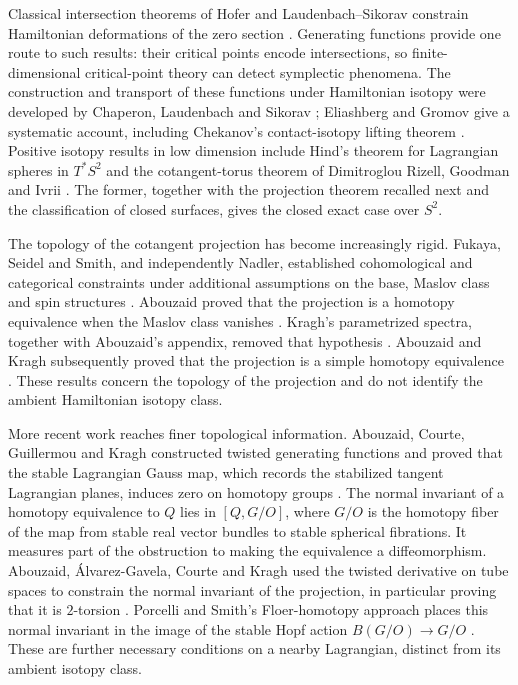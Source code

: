 Classical intersection theorems of Hofer and Laudenbach--Sikorav constrain
Hamiltonian deformations of the zero section
\cite{Hofer1985,LaudenbachSikorav1985}. Generating functions provide one
route to such results: their critical points encode intersections, so
finite-dimensional critical-point theory can detect symplectic phenomena.
The construction and transport of these functions under Hamiltonian
isotopy were developed by Chaperon, Laudenbach and Sikorav
\cite{Chaperon1984,LaudenbachSikorav1985,Sikorav1987}; Eliashberg and Gromov give a systematic
account, including Chekanov's contact-isotopy lifting theorem
\cite[Theorem~4.1.1]{EG1998}. Positive isotopy results in low
dimension include Hind's theorem for Lagrangian spheres in $T^*S^2$
\cite[Theorem~1]{Hind2012} and the cotangent-torus theorem of Dimitroglou
Rizell, Goodman and Ivrii \cite[Theorem~B]{DGI2016}. The former, together
with the projection theorem recalled next and the classification of
closed surfaces, gives the closed exact case over $S^2$.

The topology of the cotangent projection has become increasingly rigid.
Fukaya, Seidel and Smith, and independently Nadler, established
cohomological and categorical constraints under additional assumptions
on the base, Maslov class and spin structures \cite{FSS2008,Nadler2009}.
Abouzaid proved that the projection is a homotopy equivalence when the
Maslov class vanishes \cite{Abouzaid2012}. Kragh's
parametrized spectra, together with Abouzaid's appendix, removed that
hypothesis \cite[Corollary~1.2 and Theorem~E.2]{Kragh2013}.
Abouzaid and Kragh subsequently proved that the projection is a simple
homotopy equivalence \cite[Theorem~1]{AK2018}. These results concern the
topology of the projection and do not identify the ambient Hamiltonian
isotopy class.

More recent work reaches finer topological information. Abouzaid,
Courte, Guillermou and Kragh constructed twisted generating functions
and proved that the stable Lagrangian Gauss map, which records the
stabilized tangent Lagrangian planes, induces zero on homotopy groups
\cite{ACGK2025}. The normal invariant of a homotopy equivalence to $Q$
lies in $[Q,G/O]$, where $G/O$ is the homotopy fiber of the map from
stable real vector bundles to stable spherical fibrations. It measures
part of the obstruction to making the equivalence a diffeomorphism.
Abouzaid, \mbox{\'{A}lvarez-Gavela},
Courte and Kragh used the twisted derivative on tube spaces to constrain
the normal invariant of the projection, in particular proving that it
is $2$-torsion \cite[Corollary~1.2]{AACK2025}. Porcelli and Smith's
Floer-homotopy approach places this normal invariant in the image of the
stable Hopf action $B(G/O)\to G/O$ \cite[Theorem~6]{PorcelliSmith2026}.
These are further necessary conditions on a nearby
Lagrangian, distinct from its ambient isotopy class.


